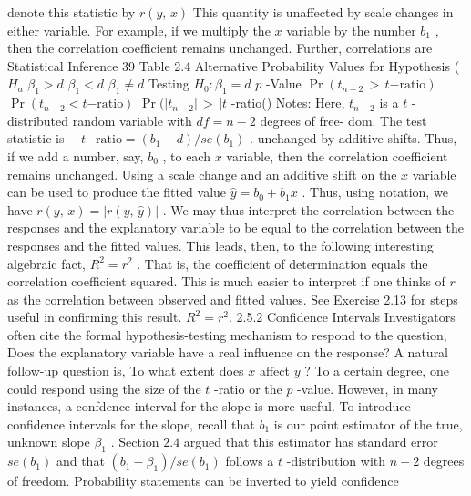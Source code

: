 \documentclass[11pt]{article}
\begin{document}
denote this statistic by \(r ( y , \, x )\) This quantity is unaffected by scale changes
in either variable. For example, if we multiply the \(x\) variable by the number
\(b_{1}\) , then the correlation coefficient remains unchanged. Further, correlations are
 Statistical Inference 39
Table 2.4
Alternative Probability Values for
Hypothesis ( \(H_{a}\) \(\beta_{1} > d\) \(\beta_{1} < d\) \(\beta_{1} \neq d\) Testing \(H_{0} : \beta_{1}=d\)
\(p\) -Value \(\operatorname* {P r} ( t_{n-2} \, > \, t \mathrm{-r a t i o} )\) \(\operatorname* {P r} ( t_{n-2} < t \mathrm{-r a t i o} )\) \(\operatorname* {P r} ( | t_{n-2} | \, > \, | t\) -ratio()
Notes: Here, \(t_{n-2}\) is a \(t\) -distributed random variable with \(d f=n-2\) degrees of free-
dom. The test statistic is \(\quad t \mathrm{-r a t i o}=( b_{1}-d ) / s e ( b_{1} )\) .
unchanged by additive shifts. Thus, if we add a number, say, \(b_{0}\) , to each \(x\)
 variable, then the correlation coefficient remains unchanged. Using a scale change
and an additive shift on the \(x\) variable can be used to produce the fitted value
\(\widehat{y}=b_{0}+b_{1} x\) . Thus, using notation, we have \(r ( y , \, x )=\vert r ( y , \, \widehat{y} ) \vert\) . We may thus
 interpret the correlation between the responses and the explanatory variable to be
 equal to the correlation between the responses and the fitted values. This leads,
 then, to the following interesting algebraic fact, \(R^{2}=r^{2}\) . That is, the coefficient
 of determination equals the correlation coefficient squared. This is much easier to
 interpret if one thinks of \(r\) as the correlation between observed and fitted values.
See Exercise 2.13 for steps useful in confirming this result. \(R^{2}=r^{2} .\)
2.5.2 Confidence Intervals
 Investigators often cite the formal hypothesis-testing mechanism to respond to the
 question, Does the explanatory variable have a real influence on the response? \(\mathrm{A}\)
 natural follow-up question is, To what extent does \(x\) affect \(y\) ? To a certain degree,
 one could respond using the size of the \(t\) -ratio or the \(p\) -value. However, in many
instances, a confdence interval for the slope is more useful.
To introduce confidence intervals for the slope, recall that \(b_{1}\) is our point
 estimator of the true, unknown slope \(\beta_{1}\) . Section \(2 . 4\) argued that this estimator has
 standard error \(s e ( b_{1} )\) and that \(\left( b_{1}-\beta_{1} \right) / s e ( b_{1} )\) follows a \(t\) -distribution with \(n-2\)
degrees of freedom. Probability statements can be inverted to yield confidence
\end{document}
